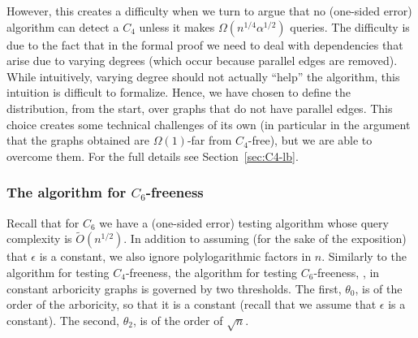 \documentclass{article}
\newcommand{\eps}{\epsilon}
\newcommand{\commentt}[1]{ {}}
\newcommand{\ICALPCR}[1]{{#1}}
\newcommand{\TestCsix}{\hyperref[alg:C6]{\color{black}{\textsf{Test-$C_6$-freeness}}}}
\begin{document}
However, this creates a 
difficulty when we turn to argue that no (one-sided error) algorithm can detect a $C_4$ unless it makes $\Omega(n^{1/4}\alpha^{1/2})$ queries. The difficulty is due to the fact that %
in the formal proof we need to deal with dependencies that arise due to varying degrees (which occur because parallel edges are removed). While intuitively, varying degree should not actually ``help'' the algorithm, this intuition is difficult to formalize.
Hence, we have chosen to define the distribution, from the start, over graphs that do not have parallel edges.
This choice creates some technical challenges of its own (in particular in the argument that the graphs obtained are $\Omega(1)$-far from $C_4$-free), but we are able to overcome them. For the full details see Section~\ref{sec:C4-lb}.




\subsubsection{The algorithm for $C_6$-freeness}
\ICALPCR{Recall that for $C_6$ we have a (one-sided error) testing algorithm whose query complexity is $\widetilde{O}(n^{1/2})$.}
In addition to assuming (for the sake of the exposition) that $\eps$ is a constant, we also 
ignore polylogarithmic factors in $n$. Similarly to the algorithm for testing $C_4$-freeness, the algorithm for testing $C_6$-freeness, \TestCsix,  in constant arboricity graphs is governed by two thresholds. The first, $\theta_0$, is of the order of the arboricity, so that it is a constant (recall that we assume that $\eps$ is a constant). The second, $\theta_2$, is of the order of $\sqrt{n}$.
\end{document}
